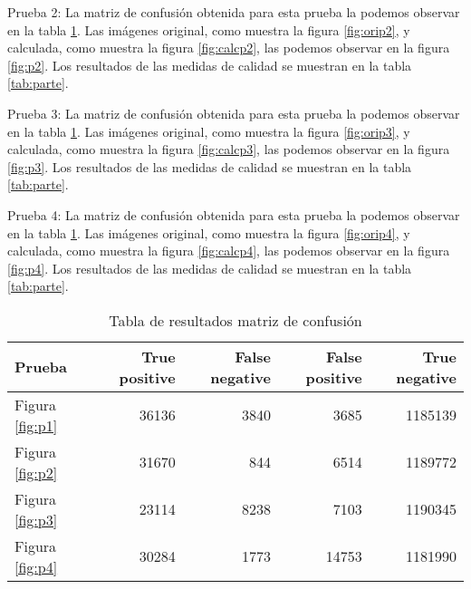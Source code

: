 Prueba 2: La matriz de confusión obtenida para esta prueba la podemos observar en la tabla \ref{tab:pruebas}.
Las imágenes original, como muestra la figura \ref{fig:orip2}, y calculada, como muestra la figura \ref{fig:calcp2}, las podemos observar en la figura \ref{fig:p2}.
Los resultados de las medidas de calidad se muestran en la tabla \ref{tab:parte}.

Prueba 3: La matriz de confusión obtenida para esta prueba la podemos observar en la tabla \ref{tab:pruebas}.
Las imágenes original, como muestra la figura \ref{fig:orip3}, y calculada, como muestra la figura \ref{fig:calcp3}, las podemos observar en la figura \ref{fig:p3}.
Los resultados de las medidas de calidad se muestran en la tabla \ref{tab:parte}.

Prueba 4: La matriz de confusión obtenida para esta prueba la podemos observar en la tabla \ref{tab:pruebas}.
Las imágenes original, como muestra la figura \ref{fig:orip4}, y calculada, como muestra la figura \ref{fig:calcp4}, las podemos observar en la figura \ref{fig:p4}.
Los resultados de las medidas de calidad se muestran en la tabla \ref{tab:parte}.




\begin{table}[]
\centering
\caption{Tabla de resultados matriz de confusión}
\label{tab:pruebas}
\begin{tabular}{@{} lrrrr @{}}
\hline
Prueba                & True positive & False negative & False positive & True negative \\ \hline
Figura \ref{fig:p1} & 36136         & 3840           & 3685           & 1185139       \\ \hline
Figura \ref{fig:p2} & 31670         & 844            & 6514           & 1189772       \\ \hline
Figura \ref{fig:p3} & 23114         & 8238           & 7103           & 1190345       \\ \hline
Figura \ref{fig:p4} & 30284         & 1773           & 14753          & 1181990       \\ \hline
\end{tabular}
\end{table}



